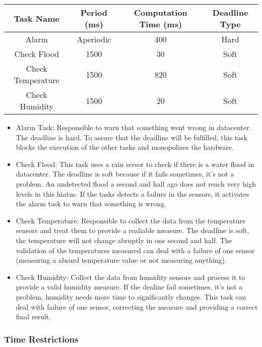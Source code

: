 \documentclass[12pt]{article}
\begin{document}
\begin{table}[H]
    \begin{tabular}{|c|c|c|c|}
        \hline
        \textbf{Task Name}& \textbf{Period (ms)}& \textbf{Computation Time (ms)}& \textbf{Deadline Type} \\ \hline
        Alarm             & Aperiodic   & 400                   & Hard          \\ \hline
        Check Flood       & 1500        & 30                    & Soft          \\ \hline
        Check Temperature & 1500        & 820                   & Soft          \\ \hline
        Check Humidity    & 1500        & 20                    & Soft          \\
        \hline
    \end{tabular}
\end{table}

\begin{itemize}
 \item Alarm Task: Responsible to warn that something went wrong in datacenter. The deadline is hard. To assure
 that the deadline will be fulfilled, this task blocks the execution of the other tasks and monopolizes the hardware.
 \item Check Flood: This task uses a rain sersor to check if there is a water flood in datacenter. The deadline is
 soft because if it fails sometimes, it's not a problem. An undetected flood a second and half ago does not reach
 very high levels in this hiatus. If the tasks detects a failure in the sensors, it activates the alarm task to warn
 that something is wrong.
 \item Check Temperature: Responsible to collect the data from the temperature sensors and treat them to provide
 a realiable measure. The deadline is soft, the temperature will not change abruptly in one second and half. The
 validation of the temperatures measured can deal with a failure of one sensor (measuring a absurd temperature value
 or not measuring anything).
 \item Check Humidity: Collect the data from humidity sensors and process it to provide a valid humidity measure. If the
 dealine fail sometimes, it's not a problem, humidity needs more time to significantly changes. This task can deal with 
 failure of one sensor, correcting the measure and providing a correct final result.
\end{itemize}

\subsubsection{Time Restrictions}
\end{document}
